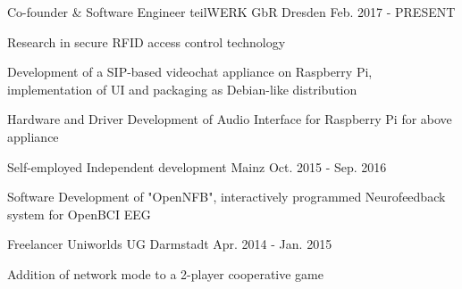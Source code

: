 

\begin{cventries}

  \cventry
    {Co-founder \& Software Engineer} %
    {teilWERK GbR} %
    {Dresden} %
    {Feb. 2017 - PRESENT} %
    {
      \begin{cvitems} %
        \item {Research in secure RFID access control technology}
        \item {Development of a SIP-based videochat appliance on Raspberry Pi, implementation of UI and packaging as Debian-like distribution}
        \item {Hardware and Driver Development of Audio Interface for Raspberry Pi for above appliance}
      \end{cvitems}
    }

  \cventry
    {Self-employed} %
    {Independent development} %
    {Mainz} %
    {Oct. 2015 - Sep. 2016} %
    {
      \begin{cvitems} %
        \item {Software Development of "OpenNFB", interactively programmed Neurofeedback system for OpenBCI EEG}
      \end{cvitems}
    }

  \cventry
    {Freelancer} %
    {Uniworlds UG} %
    {Darmstadt} %
    {Apr. 2014 - Jan. 2015} %
    {
      \begin{cvitems} %
        \item {Addition of network mode to a 2-player cooperative game}
      \end{cvitems}
    }


\end{cventries}
